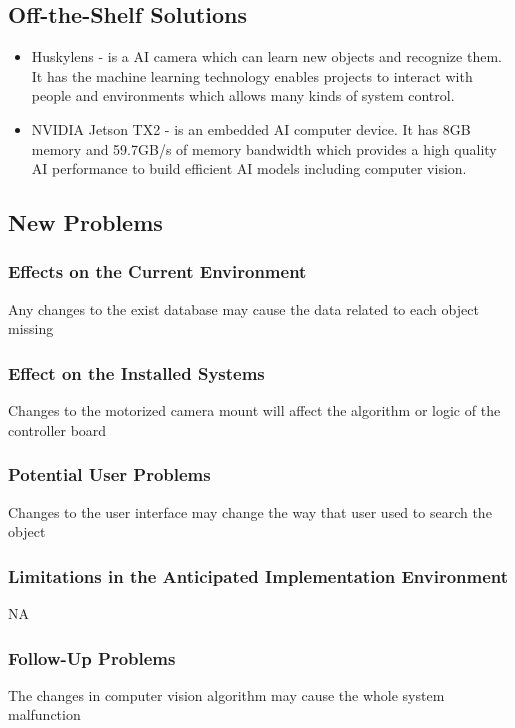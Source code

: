 \documentclass[12pt]{article}
\begin{document}
\subsection{Off-the-Shelf Solutions}
\begin{itemize}

    \item Huskylens - is a AI camera which can learn new objects and recognize them. It has the machine learning technology enables projects to interact with people and environments which allows many kinds of system control.
    \item NVIDIA Jetson TX2 - is an embedded AI computer device. It has 8GB memory and 59.7GB/s of memory bandwidth which provides a high quality AI performance to build efficient AI models including computer vision.
\end{itemize}


\subsection{New Problems}
    \subsubsection{Effects on the Current Environment}
       \hspace{0.5cm} Any changes to the exist database may cause the data related to each object missing
    \subsubsection{Effect on the Installed Systems}
        \hspace{0.5cm} Changes to the motorized camera mount will affect the algorithm or logic of the controller board
    \subsubsection{Potential User Problems}
        \hspace{0.5cm} Changes to the user interface may change the way that user used to search the object
    
    \subsubsection{Limitations in the Anticipated Implementation Environment}
        \hspace{0.5cm}NA
    \subsubsection{Follow-Up Problems}
        \hspace{0.5cm} The changes in computer vision algorithm may cause the whole system malfunction
\end{document}

